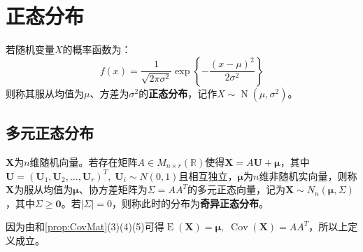 \section{正态分布}
\begin{definition}
	若随机变量$X$的概率函数为：
	\begin{equation*}
		f(x)=\frac{1}{\sqrt{2\pi\sigma^2}}\exp\left\{-\frac{(x-\mu)^2}{2\sigma^2}\right\}
	\end{equation*}
	则称其服从均值为$\mu$、方差为$\sigma^2$的\textbf{正态分布}，记作$X\sim\operatorname{N}(\mu,\sigma^2)$。
\end{definition}
\subsection{多元正态分布}
\begin{definition}\label{def:MultiNormal}
	$\mathbf{X}$为$n$维随机向量。若存在矩阵$A\in M_{n\times r}(\mathbb{R})$使得$\mathbf{X}=A\mathbf{U}+\boldsymbol{\mu}$，其中$\mathbf{U}=(\mathbf{U}_1,\mathbf{U}_2,\dots,\mathbf{U}_r)^T,\;\mathbf{U}_i\sim N(0,1)$且相互独立，$\boldsymbol{\mu}$为$n$维非随机实向量，则称$\mathbf{X}$为服从均值为$\boldsymbol{\mu}$、协方差矩阵为$\Sigma=AA^T$的多元正态向量，记为$\mathbf{X}\sim N_n(\boldsymbol{\mu},\Sigma)$，其中$\Sigma\geqslant\mathbf{0}$。若$|\Sigma|=0$，则称此时的分布为\textbf{奇异正态分布}。
\end{definition}
\begin{note}
	因为由和\cref{prop:CovMat}(3)(4)(5)可得$\operatorname{E}(\mathbf{X})=\boldsymbol{\mu},\;\operatorname{Cov}(\mathbf{X})=AA^T$，所以上定义成立。
\end{note}

